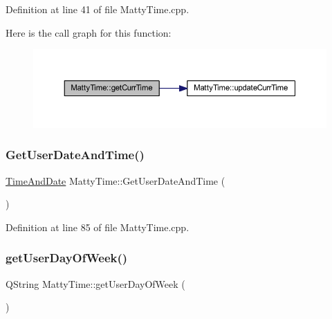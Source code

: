Definition at line 41 of file Matty\+Time.\+cpp.

Here is the call graph for this function\+:
\nopagebreak
\begin{figure}[H]
\begin{center}
\leavevmode
\includegraphics[width=350pt]{classMattyTime_a64fff9c9a7da58881a4c0cc1a2ac84f7_cgraph}
\end{center}
\end{figure}
\hypertarget{classMattyTime_ac2f2f818e4c476cc11f9c13e97cacfae}{}\label{classMattyTime_ac2f2f818e4c476cc11f9c13e97cacfae} 
\subsubsection{\texorpdfstring{Get\+User\+Date\+And\+Time()}{GetUserDateAndTime()}}
{\footnotesize\ttfamily \hyperlink{structTimeAndDate}{Time\+And\+Date} Matty\+Time\+::\+Get\+User\+Date\+And\+Time (\begin{DoxyParamCaption}{ }\end{DoxyParamCaption})}



Definition at line 85 of file Matty\+Time.\+cpp.

\hypertarget{classMattyTime_ad2f12ac7d1a959ee9e19a4eac30484fd}{}\label{classMattyTime_ad2f12ac7d1a959ee9e19a4eac30484fd} 
\subsubsection{\texorpdfstring{get\+User\+Day\+Of\+Week()}{getUserDayOfWeek()}}
{\footnotesize\ttfamily Q\+String Matty\+Time\+::get\+User\+Day\+Of\+Week (\begin{DoxyParamCaption}{ }\end{DoxyParamCaption})}



